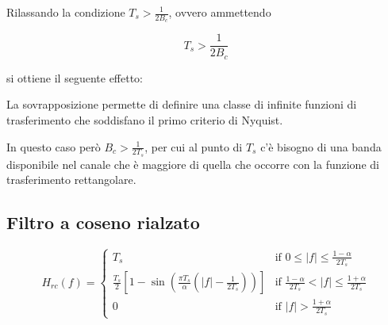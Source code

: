 Rilassando la condizione $T_s > \frac{1}{2B_c}$, ovvero ammettendo

\[ T_s > \frac{1}{2B_c} \]

si ottiene il seguente effetto:

\begin{center}
    
\end{center}

La sovrapposizione permette di definire una classe di infinite funzioni di trasferimento che soddisfano il primo criterio di Nyquist.

In questo caso però $B_c > \frac{1}{2T_s}$, per cui al punto di $T_s$ c'è bisogno di una banda disponibile nel canale che è maggiore di quella che occorre con la funzione di trasferimento rettangolare.

\subsection*{Filtro a coseno rialzato}

\[ H_{rc}(f) = 
  \begin{cases} 
   T_s & \text{if } 0 \leq |f| \leq \frac{1-\alpha}{2T_s} \\
   \frac{T_s}{2} \left[ 1 - \sin\left(\frac{\pi T_s}{\alpha} \left( |f| - \frac{1}{2T_s} \right)\right) \right] & \text{if } \frac{1-\alpha}{2T_s} < |f| \leq \frac{1+\alpha}{2T_s} \\
   0 & \text{if } |f| > \frac{1+\alpha}{2T_s}
  \end{cases}
\]

